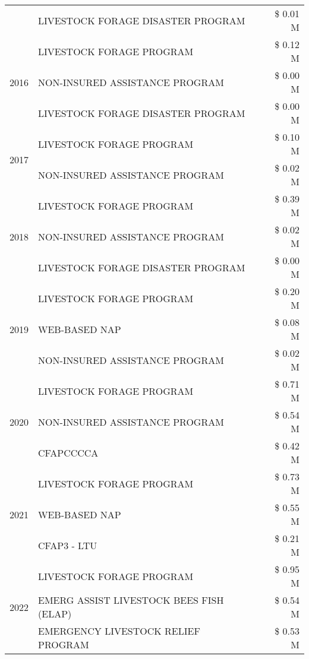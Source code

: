 \begin{tabular}{llr}
 & LIVESTOCK FORAGE DISASTER PROGRAM & \$ 0.01 M \\
\cline{1-3}
\multirow[t]{3}{*}{2016} & LIVESTOCK FORAGE PROGRAM & \$ 0.12 M \\
 & NON-INSURED ASSISTANCE PROGRAM & \$ 0.00 M \\
 & LIVESTOCK FORAGE DISASTER PROGRAM & \$ 0.00 M \\
\cline{1-3}
\multirow[t]{2}{*}{2017} & LIVESTOCK FORAGE PROGRAM & \$ 0.10 M \\
 & NON-INSURED ASSISTANCE PROGRAM & \$ 0.02 M \\
\cline{1-3}
\multirow[t]{3}{*}{2018} & LIVESTOCK FORAGE PROGRAM & \$ 0.39 M \\
 & NON-INSURED ASSISTANCE PROGRAM & \$ 0.02 M \\
 & LIVESTOCK FORAGE DISASTER PROGRAM & \$ 0.00 M \\
\cline{1-3}
\multirow[t]{3}{*}{2019} & LIVESTOCK FORAGE PROGRAM & \$ 0.20 M \\
 & WEB-BASED NAP & \$ 0.08 M \\
 & NON-INSURED ASSISTANCE PROGRAM & \$ 0.02 M \\
\cline{1-3}
\multirow[t]{3}{*}{2020} & LIVESTOCK FORAGE PROGRAM & \$ 0.71 M \\
 & NON-INSURED ASSISTANCE PROGRAM & \$ 0.54 M \\
 & CFAPCCCCA & \$ 0.42 M \\
\cline{1-3}
\multirow[t]{3}{*}{2021} & LIVESTOCK FORAGE PROGRAM & \$ 0.73 M \\
 & WEB-BASED NAP & \$ 0.55 M \\
 & CFAP3 - LTU & \$ 0.21 M \\
\cline{1-3}
\multirow[t]{3}{*}{2022} & LIVESTOCK FORAGE PROGRAM & \$ 0.95 M \\
 & EMERG ASSIST LIVESTOCK BEES FISH (ELAP) & \$ 0.54 M \\
 & EMERGENCY LIVESTOCK RELIEF PROGRAM & \$ 0.53 M \\
\cline{1-3}
\bottomrule
\end{tabular}
